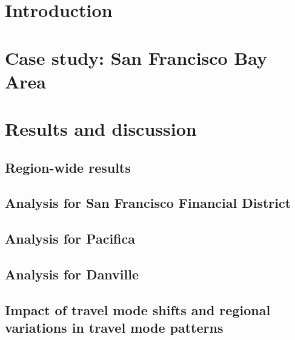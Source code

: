 \documentclass[3p,times]{elsarticle}
\begin{document}
\linenumbers

\section{Introduction}
\label{sec:accIntro}



\section{Case study: San Francisco Bay Area}
\label{sec:accCase}

%

\section{Results and discussion}
\label{sec:results}

	\subsection{Region-wide results}
	\label{sec:accAll}
	
	
	
	\subsection{Analysis for San Francisco Financial District}
	\label{sec:accSF}
	
	
	
	\subsection{Analysis for Pacifica}
	\label{sec:accPacifica}
	
	
	
	\subsection{Analysis for Danville}
	\label{sec:accDanville}
	

	\subsection{Impact of travel mode shifts and regional variations in travel mode patterns}
	\label{sec:accDisc}
	
\end{document}
